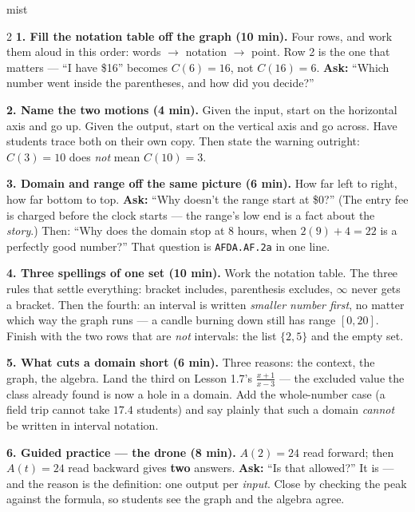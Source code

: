 \documentclass[10pt]{article}
\begin{document}
\boxguard
\begin{skillbox}[Lesson]{mist}
\begin{multicols}{2}
\textbf{1. Fill the notation table off the graph (10 min).} Four rows, and work them aloud in this
order: words $\to$ notation $\to$ point. Row 2 is the one that matters --- ``I have \$16'' becomes
$C(6)=16$, not $C(16)=6$. \textbf{Ask:} ``Which number went inside the parentheses, and how did you
decide?''

\textbf{2. Name the two motions (4 min).} Given the input, start on the horizontal axis and go up.
Given the output, start on the vertical axis and go across. Have students trace both on their own
copy. Then state the warning outright: $C(3)=10$ does \emph{not} mean $C(10)=3$.

\textbf{3. Domain and range off the same picture (6 min).} How far left to right, how far bottom
to top. \textbf{Ask:} ``Why doesn't the range start at \$0?'' (The entry fee is charged before the
clock starts --- the range's low end is a fact about the \emph{story}.) Then: ``Why does the domain
stop at 8 hours, when $2(9)+4=22$ is a perfectly good number?'' That question is
\texttt{AFDA.AF.2a} in one line.

\textbf{4. Three spellings of one set (10 min).} Work the notation table. The three rules that
settle everything: bracket includes, parenthesis excludes, $\infty$ never gets a bracket. Then the
fourth: an interval is written \emph{smaller number first}, no matter which way the graph runs ---
a candle burning down still has range $[0,20]$. Finish with the two rows that are \emph{not}
intervals: the list $\{2,5\}$ and the empty set.

\textbf{5. What cuts a domain short (6 min).} Three reasons: the context, the graph, the algebra.
Land the third on Lesson 1.7's $\frac{x+1}{x-3}$ --- the excluded value the class already found is
now a hole in a domain. Add the whole-number case (a field trip cannot take $17.4$ students) and
say plainly that such a domain \emph{cannot} be written in interval notation.

\textbf{6. Guided practice --- the drone (8 min).} $A(2)=24$ read forward; then $A(t)=24$ read
backward gives \textbf{two} answers. \textbf{Ask:} ``Is that allowed?'' It is --- and the reason is
the definition: one output per \emph{input}. Close by checking the peak against the formula, so
students see the graph and the algebra agree.
\end{multicols}
\end{skillbox}
\end{document}
